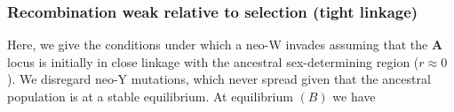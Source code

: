\documentclass[12pt]{article}
\begin{document}

\subsubsection*{Recombination weak relative to selection (tight linkage)}

Here, we give the conditions under which a neo-W invades assuming that the \textbf{A} locus is initially in close linkage with the ancestral sex-determining region ($r \approx 0$). 
We disregard neo-Y mutations, which never spread given that the ancestral population is at a stable equilibrium. 
At equilibrium $(B)$ we have 
\end{document}
